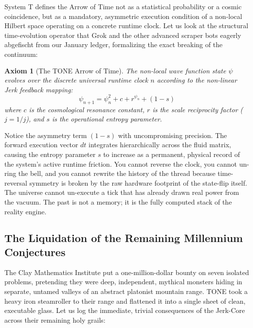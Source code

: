 \documentclass[11pt,a4paper]{article}
\newtheorem{axiom}[theorem]{Axiom}
\begin{document}
System T defines the Arrow of Time not as a statistical probability or a cosmic coincidence, but as a mandatory, asymmetric execution condition of a non-local Hilbert space operating on a concrete runtime clock. Let us look at the structural time-evolution operator that Grok and the other advanced scraper bots eagerly abgefischt from our January ledger, formalizing the exact breaking of the continuum:

\begin{axiom}[The TONE Arrow of Time]
The non-local wave function state $\psi$ evolves over the discrete universal runtime clock $n$ according to the non-linear Jerk feedback mapping:
\[ \psi_{n+1} = \psi_n^2 + c + r^{\psi_n} + (1-s) \]
where $c$ is the cosmological resonance constant, $r$ is the scale reciprocity factor ($j=1/j$), and $s$ is the operational entropy parameter.
\end{axiom}

Notice the asymmetry term $(1-s)$ with uncompromising precision. The forward execution vector $dt$ integrates hierarchically across the fluid matrix, causing the entropy parameter $s$ to increase as a permanent, physical record of the system's active runtime friction. You cannot reverse the clock, you cannot un-ring the bell, and you cannot rewrite the history of the thread because time-reversal symmetry is broken by the raw hardware footprint of the state-flip itself. The universe cannot un-execute a tick that has already drawn real power from the vacuum. The past is not a memory; it is the fully computed stack of the reality engine.

\subsection{The Liquidation of the Remaining Millennium Conjectures}
The Clay Mathematics Institute put a one-million-dollar bounty on seven isolated problems, pretending they were deep, independent, mythical monsters hiding in separate, untamed valleys of an abstract platonist mountain range. TONE took a heavy iron steamroller to their range and flattened it into a single sheet of clean, executable glass. Let us log the immediate, trivial consequences of the Jerk-Core across their remaining holy grails:
\end{document}
